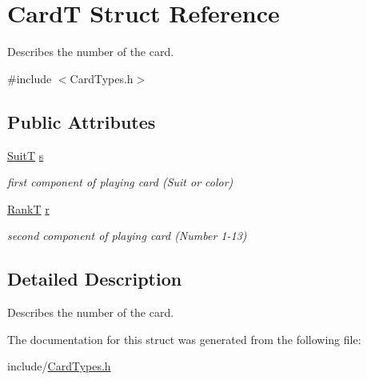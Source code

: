 \hypertarget{struct_card_t}{}\section{CardT Struct Reference}
\label{struct_card_t}


Describes the number of the card.  




{\ttfamily \#include $<$Card\+Types.\+h$>$}

\subsection*{Public Attributes}
\begin{DoxyCompactItemize}
\item 
\mbox{\label{struct_card_t_a385c4f8ec261203df28f85f69f28780d}} 
\mbox{\hyperlink{_card_types_8h_a693d1a7b7ef1b91ead9c7dfc49830565}{SuitT}} \mbox{\hyperlink{struct_card_t_a385c4f8ec261203df28f85f69f28780d}{s}}
\begin{DoxyCompactList}\small\item\em first component of playing card (Suit or color) \end{DoxyCompactList}\item 
\mbox{\label{struct_card_t_a306faf354f2fb4bb43439f84bbc49f05}} 
\mbox{\hyperlink{_card_types_8h_aa7b61ab74252d345d621b846db6238f1}{RankT}} \mbox{\hyperlink{struct_card_t_a306faf354f2fb4bb43439f84bbc49f05}{r}}
\begin{DoxyCompactList}\small\item\em second component of playing card (Number 1-\/13) \end{DoxyCompactList}\end{DoxyCompactItemize}


\subsection{Detailed Description}
Describes the number of the card. 

The documentation for this struct was generated from the following file\+:\begin{DoxyCompactItemize}
\item 
include/\mbox{\hyperlink{_card_types_8h}{Card\+Types.\+h}}\end{DoxyCompactItemize}
